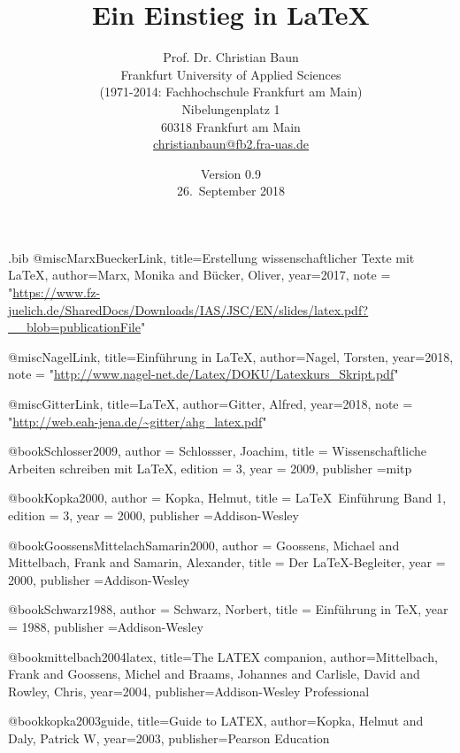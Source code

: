 \documentclass[a4paper,10pt,twoside]{scrbook}
\begin{document}
\begin{filecontents*}{\jobname.bib}
@misc{MarxBueckerLink,
	title={{Erstellung wissenschaftlicher Texte mit \LaTeX}},
	author={Marx, Monika and Bücker, Oliver},
	year={2017},
	note = "\url{https://www.fz-juelich.de/SharedDocs/Downloads/IAS/JSC/EN/slides/latex.pdf?__blob=publicationFile}"
}
   
@misc{NagelLink,
   	title={{Einführung in \LaTeX}},
   	author={Nagel, Torsten},
   	year={2018},
   	note = "\url{http://www.nagel-net.de/Latex/DOKU/Latexkurs_Skript.pdf}"
}

@misc{GitterLink,
	title={{\LaTeX}},
	author={Gitter, Alfred},
	year={2018},
	note = "\url{http://web.eah-jena.de/~gitter/ahg_latex.pdf}"
}

@book{Schlosser2009,
	author = {Schlossser, Joachim},
	title = {{Wissenschaftliche Arbeiten schreiben mit \LaTeX}},
	edition = {3},
	year = {2009},
	publisher ={mitp}
}


@book{Kopka2000,
	author = {Kopka, Helmut},
	title = {{\LaTeX\ Einführung Band 1}},
	edition = {3},
	year = {2000},
	publisher ={Addison-Wesley}
}


@book{GoossensMittelachSamarin2000,
	author = {Goossens, Michael and Mittelbach, Frank and Samarin, Alexander},
	title = {{Der \LaTeX-Begleiter}},
	year = {2000},
	publisher ={Addison-Wesley}
}


@book{Schwarz1988,
	author = {Schwarz, Norbert},
	title = {{Einführung in \TeX}},
	year = {1988},
    publisher ={Addison-Wesley}
}
  
@book{mittelbach2004latex,
	title={The LATEX companion},
	author={Mittelbach, Frank and Goossens, Michel and Braams, Johannes and Carlisle, David and Rowley, Chris},
	year={2004},
	publisher={Addison-Wesley Professional}
}

@book{kopka2003guide,
	title={Guide to LATEX},
	author={Kopka, Helmut and Daly, Patrick W},
	year={2003},
	publisher={Pearson Education}
}

\end{filecontents*}

\renewcommand{\arraystretch}{1}

\title{Ein Einstieg in \LaTeX}
\author{Prof. Dr. Christian Baun\\ Frankfurt University of Applied Sciences \\ (1971-2014: Fachhochschule Frankfurt am Main)\\
Nibelungenplatz 1 \\ 60318 Frankfurt am Main\\\url{christianbaun@fb2.fra-uas.de}\\[3em]}
\date{Version 0.9\\[3em] 26.~September 2018}
\end{document}

